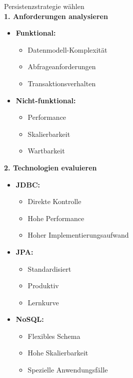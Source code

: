 \begin{KR}{Persistenzstrategie wählen}\\
\textbf{1. Anforderungen analysieren}
\begin{itemize}
    \item \textbf{Funktional:}
    \begin{itemize}
        \item Datenmodell-Komplexität
        \item Abfrageanforderungen
        \item Transaktionsverhalten
    \end{itemize}
    \item \textbf{Nicht-funktional:}
    \begin{itemize}
        \item Performance
        \item Skalierbarkeit
        \item Wartbarkeit
    \end{itemize}
\end{itemize}

\textbf{2. Technologien evaluieren}
\begin{itemize}
    \item \textbf{JDBC:}
    \begin{itemize}
        \item Direkte Kontrolle
        \item Hohe Performance
        \item Hoher Implementierungsaufwand
    \end{itemize}
    \item \textbf{JPA:}
    \begin{itemize}
        \item Standardisiert
        \item Produktiv
        \item Lernkurve
    \end{itemize}
    \item \textbf{NoSQL:}
    \begin{itemize}
        \item Flexibles Schema
        \item Hohe Skalierbarkeit
        \item Spezielle Anwendungsfälle
    \end{itemize}
\end{itemize}
\end{KR}

